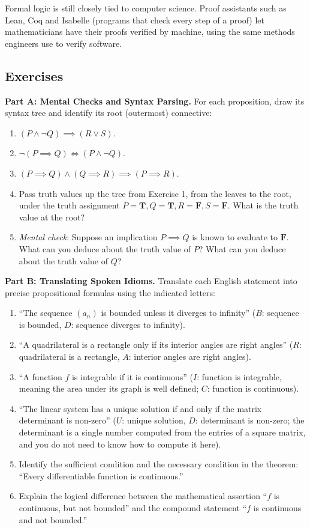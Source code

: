 \begin{historybox}
Formal logic is still closely tied to computer science. Proof assistants such as Lean, Coq and Isabelle (programs that check every step of a proof) let mathematicians have their proofs verified by machine, using the same methods engineers use to verify software.
\end{historybox}

\subsection{Exercises}

\textbf{Part A: Mental Checks and Syntax Parsing.} For each proposition, draw its syntax tree and identify its root (outermost) connective:
\begin{enumerate}
\item $(P \land \neg Q) \implies (R \lor S)$.
\item $\neg(P \implies Q) \iff (P \land \neg Q)$.
\item $(P \implies Q) \land (Q \implies R) \implies (P \implies R)$.
\item Pass truth values up the tree from Exercise 1, from the leaves to the root, under the truth assignment $P = \mathbf{T}, Q = \mathbf{T}, R = \mathbf{F}, S = \mathbf{F}$. What is the truth value at the root?
\item \emph{Mental check}: Suppose an implication $P \implies Q$ is known to evaluate to $\mathbf{F}$. What can you deduce about the truth value of $P$? What can you deduce about the truth value of $Q$?
\end{enumerate}

\textbf{Part B: Translating Spoken Idioms.} Translate each English statement into precise propositional formulas using the indicated letters:
\begin{enumerate}[resume]
\item ``The sequence $(a_n)$ is bounded unless it diverges to infinity'' ($B$: sequence is bounded, $D$: sequence diverges to infinity).
\item ``A quadrilateral is a rectangle only if its interior angles are right angles'' ($R$: quadrilateral is a rectangle, $A$: interior angles are right angles).
\item ``A function $f$ is integrable if it is continuous'' ($I$: function is integrable, meaning the area under its graph is well defined; $C$: function is continuous).
\item ``The linear system has a unique solution if and only if the matrix determinant is non-zero'' ($U$: unique solution, $D$: determinant is non-zero; the determinant is a single number computed from the entries of a square matrix, and you do not need to know how to compute it here).
\item Identify the sufficient condition and the necessary condition in the theorem: ``Every differentiable function is continuous.''
\item Explain the logical difference between the mathematical assertion ``$f$ is continuous, but not bounded'' and the compound statement ``$f$ is continuous and not bounded.''
\end{enumerate}

